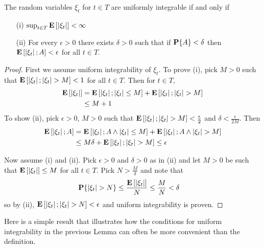 \begin{lem}\label{UniformIntegrabilityProperties}The random variables $\xi_t$ for $t \in T$ are uniformly
  integrable if and only if
\begin{itemize}
\item[(i)] $\sup_{t \in T} \textbf{E}\left[\left \vert \xi_t \right \vert\right] < \infty$
\item[(ii)] For every $\epsilon > 0$ there exists $\delta > 0$ such
  that if $\textbf{P}\{A\} < \delta$ then $\textbf{E}\left[\left \vert \xi_t \right \vert ;
    A\right] < \epsilon$ for all $t \in T$.
\end{itemize}
\end{lem}
\begin{proof}
First we assume uniform integrability of $\xi_t$.  To prove (i), pick
$M > 0$ such that $\textbf{E}\left[\left \vert \xi_t \right \vert ; \left \vert \xi_t \right \vert > M\right] < 1$
for all $t \in T$.  Then for $t \in T$,
\begin{align*}
\textbf{E}\left[\left \vert \xi_t \right \vert\right] &= \textbf{E}\left[\left \vert \xi_t \right \vert;\left \vert \xi_t \right \vert \leq  M
\right] + \textbf{E}\left[\left \vert \xi_t \right \vert; \left \vert \xi_t \right \vert > M\right] \\
&\leq M + 1
\end{align*}
To show (ii), pick $\epsilon > 0$, $M >0 $ such that
$\textbf{E}\left[\left \vert \xi_t \right \vert ; \left \vert \xi_t \right \vert > M\right] < \frac{\epsilon}{2}$ and
$\delta < \frac{\epsilon}{2M}$.
Then
\begin{align*}
\textbf{E}\left[\left \vert \xi_t \right \vert ; A\right] &= \textbf{E}\left[\left \vert \xi_t \right \vert ; A \wedge
  \left \vert \xi_t \right \vert \leq M\right] + \textbf{E}\left[\left \vert \xi_t \right \vert ; A \wedge
  \left \vert \xi_t \right \vert > M\right] \\
&\leq M \delta + \textbf{E}\left[\left \vert \xi_t \right \vert ;   \left \vert \xi_t \right \vert > M\right] \leq \epsilon
\end{align*}

Now assume (i) and (ii).  Pick $\epsilon > 0$ and $\delta >0 $ as in
(ii) and let $M > 0$ be such that $\textbf{E}\left[\left \vert \xi_t \right \vert\right] \leq M$ for all
$t \in T$.  Pick $N > \frac{M}{\delta}$ and note that
\begin{align*}
\textbf{P}\{\left \vert \xi_t \right \vert > N\} &\leq \frac{\textbf{E}\left[\left \vert \xi_t \right \vert
  \right]}{N} \leq \frac{M}{N} < \delta
\end{align*}
so by (ii), $\textbf{E}\left[\left \vert \xi_t \right \vert; \left \vert \xi_t \right \vert > N\right] < \epsilon$
and uniform integrability is proven.
\end{proof}

Here is a simple result that illustrates how the conditions for
uniform integrability in the previous Lemma can often be more
convenient than the definition.

